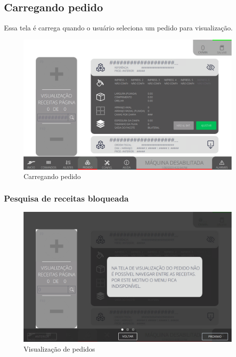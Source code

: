 \newpage
\thispagestyle{fancy}
\vspace*{40 pt}
\subsection{Carregando pedido} \label{sec:telaCarregandoPedido}
Essa tela é carrega quando o usuário seleciona um pedido para visualização.
\vspace*{\fill}
\begin{figure}[h]
    \centering
    \includegraphics[width=480 px,height=300 px]{src/imagesICV/09-request/visualization/Tela-Principal-2.png}
    \caption{Carregando pedido}
\end{figure}
\vspace*{\fill}

\newpage
\thispagestyle{fancy}
\vspace*{40 pt}
\subsubsection{\small{Pesquisa de receitas bloqueada}} \label{sec:telaCarregandoPedidoPesquisaReceitasBloqueada}
\vspace*{\fill}
\begin{figure}[h]
    \centering
    \includegraphics[width=576 px,height=360 px]{src/imagesICV/09-request/visualization/e-4.png}
    \caption{Visualização de pedidos}
\end{figure}
\vspace*{\fill}


